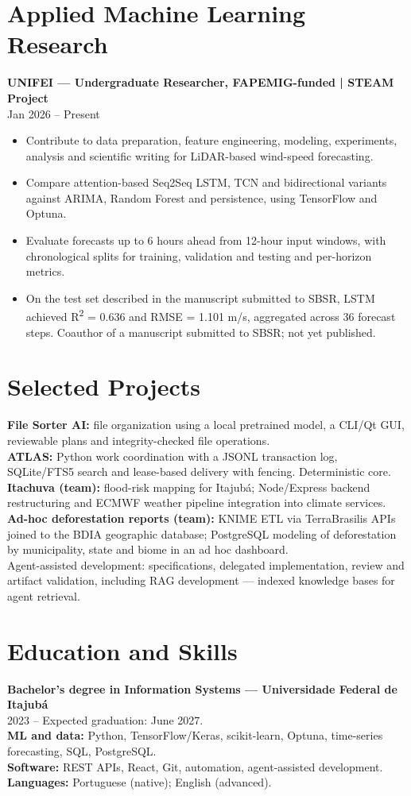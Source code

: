 \documentclass[11pt,letterpaper]{article}
\begin{document}
\section{Applied Machine Learning Research}
\textbf{UNIFEI — Undergraduate Researcher, FAPEMIG-funded | STEAM Project}\\
Jan 2026 -- Present
\begin{itemize}
\item Contribute to data preparation, feature engineering, modeling, experiments, analysis and scientific writing for LiDAR-based wind-speed forecasting.
\item Compare attention-based Seq2Seq LSTM, TCN and bidirectional variants against ARIMA, Random Forest and persistence, using TensorFlow and Optuna.
\item Evaluate forecasts up to 6 hours ahead from 12-hour input windows, with chronological splits for training, validation and testing and per-horizon metrics.
\item On the test set described in the manuscript submitted to SBSR, LSTM achieved R\textsuperscript{2} = 0.636 and RMSE = 1.101 m/s, aggregated across 36 forecast steps. Coauthor of a manuscript submitted to SBSR; not yet published.
\end{itemize}

\section{Selected Projects}
\textbf{File Sorter AI:} file organization using a local pretrained model, a CLI/Qt GUI, reviewable plans and integrity-checked file operations.\\
\textbf{ATLAS:} Python work coordination with a JSONL transaction log, SQLite/FTS5 search and lease-based delivery with fencing. Deterministic core.\\
\textbf{Itachuva (team):} flood-risk mapping for Itajubá; Node/Express backend restructuring and ECMWF weather pipeline integration into climate services.\\
\textbf{Ad-hoc deforestation reports (team):} KNIME ETL via TerraBrasilis APIs joined to the BDIA geographic database; PostgreSQL modeling of deforestation by municipality, state and biome in an ad hoc dashboard.\\
Agent-assisted development: specifications, delegated implementation, review and artifact validation, including RAG development — indexed knowledge bases for agent retrieval.

\section{Education and Skills}
\textbf{Bachelor's degree in Information Systems — Universidade Federal de Itajubá}\\
2023 -- Expected graduation: June 2027.\\
\textbf{ML and data:} Python, TensorFlow/Keras, scikit-learn, Optuna, time-series forecasting, SQL, PostgreSQL.\\
\textbf{Software:} REST APIs, React, Git, automation, agent-assisted development.\\
\textbf{Languages:} Portuguese (native); English (advanced).
\end{document}
